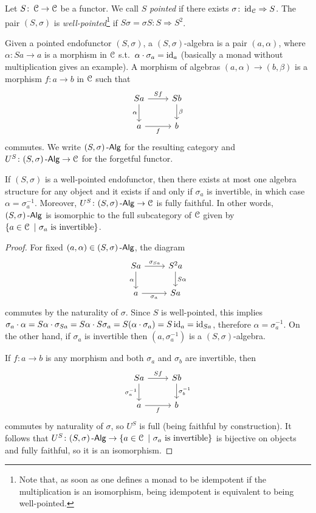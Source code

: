 \documentclass[a4paper,11pt,oneside,openany]{scrbook}
\begin{document}
\begin{defn}
	Let $S\colon\operatorname{\mathcal{C}}\to\operatorname{\mathcal{C}}$ be a functor. We call $S$ \emph{pointed} if there
    exists $\sigma\colon\operatorname{id}_{\operatorname{\mathcal{C}}}\Rightarrow S$. The pair $(S,\sigma)$ is
    \emph{well-pointed}\footnote{Note that, as soon as one defines a monad to be
    idempotent if the multiplication is an isomorphism, being idempotent is
    equivalent to being well-pointed.} if $S\sigma=\sigma S\colon S\Rightarrow
    S^2$.
\end{defn}
\begin{defn}
	Given a pointed endofunctor $(S,\sigma)$, a $(S,\sigma)$-algebra is a pair
    $(a,\alpha)$, where $\alpha\colon Sa\to a$ is a morphism in $\operatorname{\mathcal{C}}$ s.t.\
    $\alpha\cdot\sigma_a=\operatorname{id}_a$ (basically a monad without multiplication gives
    an example). A morphism of algebras $(a,\alpha)\to(b,\beta)$ is a morphism
    $f\colon a\to b$ in $\operatorname{\mathcal{C}}$ such that
	\[
		\begin{tikzcd}
			Sa\arrow["\alpha"']{d}\arrow["Sf"]{r}
			& Sb\arrow["\beta"]{d} \\
			a\arrow["f"']{r}
			& b
		\end{tikzcd}
	\]
	commutes. We write $(S,\sigma)\operatorname{-\mathsf{Alg}}$ for the resulting category and
    $U^S\colon(S,\sigma)\operatorname{-\mathsf{Alg}}\to\operatorname{\mathcal{C}}$ for the forgetful functor.
\end{defn}
\begin{lemma}
	If $(S,\sigma)$ is a well-pointed endofunctor, then there exists at most one
    algebra structure for any object and it exists if and only if $\sigma_a$ is
    invertible, in which case $\alpha=\sigma_a^{-1}$. Moreover,
    $U^S\colon(S,\sigma)\operatorname{-\mathsf{Alg}}\to\operatorname{\mathcal{C}}$ is fully faithful. In other words,
    $(S,\sigma)\operatorname{-\mathsf{Alg}}$ is isomorphic to the full subcategory of $\operatorname{\mathcal{C}}$ given by
    $\{a\in\operatorname{\mathcal{C}}\ |\ \sigma_a \ \text{is invertible} \}$.
\end{lemma}
\begin{proof}
	For fixed $(a,\alpha)\in(S,\sigma)\operatorname{-\mathsf{Alg}}$, the diagram
	\[
		\begin{tikzcd}
			Sa\arrow["\alpha"']{d}\arrow["\sigma_{Sa}"]{r}
			& S^2a\arrow["S\alpha"]{d} \\
			a\arrow["\sigma_a"']{r}
			& Sa
		\end{tikzcd}
	\]
	commutes by the naturality of $\sigma$. Since $S$ is well-pointed, this
    implies $\sigma_a\cdot\alpha=S\alpha\cdot\sigma_{Sa}=S\alpha\cdot
    S\sigma_a=S(\alpha\cdot\sigma_a)=S\operatorname{id}_a=\operatorname{id}_{Sa}$, therefore
    $\alpha=\sigma_a^{-1}$. On the other hand, if $\sigma_a$ is invertible then
    $(a,\sigma_a^{-1})$ is a $(S,\sigma)$-algebra.

	If $f\colon a\to b$ is any morphism and both $\sigma_a$ and $\sigma_b$ are
    invertible, then
	\[
		\begin{tikzcd}
			Sa\arrow["\sigma_a^{-1}"']{d}\arrow["Sf"]{r}
			& Sb\arrow["\sigma_b^{-1}"]{d} \\
			a\arrow["f"']{r}
			& b
		\end{tikzcd}
	\]
	commutes by naturality of $\sigma$, so $U^S$ is full (being faithful by
    construction). It follows that $U^S\colon(S,\sigma)\operatorname{-\mathsf{Alg}}\to\{a\in\operatorname{\mathcal{C}}\ |\
    \sigma_a \ \text{is invertible}\}$ is bijective on objects and fully
    faithful, so it is an isomorphism.
\end{proof}
\end{document}
